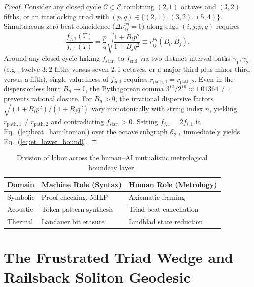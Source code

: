 \documentclass[aps,prl,twocolumn,superscriptaddress,10pt]{revtex4-2}
\begin{document}
\begin{proof}
Consider any closed cycle $\mathcal{C} \subset \mathcal{E}$ combining $(2,1)$ octaves and $(3,2)$ fifths, or an interlocking triad with $(p,q) \in \{(2,1), (3,2), (5,4)\}$. Simultaneous zero-beat coincidence ($\Delta\nu_{ij}^{pq} = 0$) along edge $(i,j;p,q)$ requires
\begin{equation}
\frac{f_{j,1}(T)}{f_{i,1}(T)} = \frac{p}{q} \sqrt{\frac{1 + B_i p^2}{1 + B_j q^2}} \equiv r_{ij}^{pq}(B_i, B_j).
\label{eq:edge_ratio}
\end{equation}
Around any closed cycle linking $f_{\text{start}}$ to $f_{\text{end}}$ via two distinct interval paths $\gamma_1, \gamma_2$ (e.g., twelve $3:2$ fifths versus seven $2:1$ octaves, or a major third plus minor third versus a fifth), single-valuedness of $f_{\text{end}}$ requires $r_{\text{path},1} = r_{\text{path},2}$. Even in the dispersionless limit $B_n \to 0$, the Pythagorean comma $3^{12}/2^{19} \approx 1.01364 \neq 1$ prevents rational closure. For $B_n > 0$, the irrational dispersive factors $\sqrt{(1+B_i p^2)/(1+B_j q^2)}$ vary monotonically with string index $n$, yielding $r_{\text{path},1} \neq r_{\text{path},2}$ and contradicting $f_{\text{start}} > 0$. Setting $f_{j,1} = 2 f_{i,1}$ in Eq.~(\ref{eq:beat_hamiltonian}) over the octave subgraph $\mathcal{E}_{2:1}$ immediately yields Eq.~(\ref{eq:et_lower_bound}).
\end{proof}

\begin{table}[t]
\caption{Division of labor across the human--AI mutualistic metrological boundary layer.}
\label{tab:mutualistic_boundary}
\begin{ruledtabular}
\footnotesize
\begin{tabular*}{\columnwidth}{@{\extracolsep{\fill}}lll}
Domain & Machine Role (Syntax) & Human Role (Metrology) \\
\hline
Symbolic & Proof checking, MILP & Axiomatic framing \\
Acoustic & Token pattern synthesis & Triad beat cancellation \\
Thermal & Landauer bit erasure & Lindblad state reduction \\
\end{tabular*}
\end{ruledtabular}
\end{table}

\section{The Frustrated Triad Wedge and Railsback Soliton Geodesic}
\end{document}
